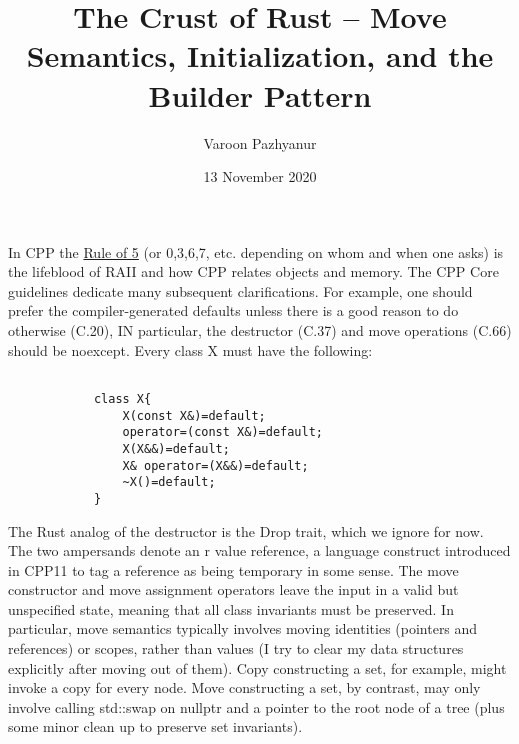 \documentclass[8pt]{beamer}
\title {The Crust of Rust -- Move Semantics, Initialization, and the Builder Pattern}
\author{Varoon Pazhyanur}
\institute{Bloomberg L.P.}
\date{13 November 2020}
\theoremstyle{remark}
\begin{document}
    \begin{frame}
        \titlepage 
    \end{frame}
    \begin{frame}[fragile]
        In CPP the \href{https://isocpp.github.io/CppCoreGuidelines/CppCoreGuidelines\#S-ctor}{Rule of 5} (or 0,3,6,7, etc. depending on whom and when one
        asks) is the lifeblood of RAII and how CPP relates objects and memory.
        The CPP Core guidelines dedicate many subsequent clarifications. For
        example, one should prefer the compiler-generated defaults unless there
        is a good reason to do otherwise (C.20), IN particular, the destructor
        (C.37) and move operations (C.66) should be noexcept. Every class X
        must have the following:

        \begin{verbatim}

            class X{
                X(const X&)=default;
                operator=(const X&)=default;
                X(X&&)=default;
                X& operator=(X&&)=default;
                ~X()=default; 
            }
        \end{verbatim}
        The Rust analog of the destructor is the Drop trait, which we ignore
        for now. The two ampersands denote an r value reference, a language
        construct introduced in CPP11 to tag a reference as being temporary in
        some sense. The move constructor and move assignment operators leave
        the input in a valid but unspecified state, meaning that all class
        invariants must be preserved. In particular, move semantics typically
        involves moving identities (pointers and references) or scopes, rather
        than values (I try to clear my data structures explicitly after moving
        out of them). Copy constructing a set, for example, might invoke a copy
        for every node. Move constructing a set, by contrast, may only involve
        calling std::swap on nullptr and a pointer to the root node of a tree
        (plus some minor clean up to preserve set invariants). 
    \end{frame}
\end{document}
